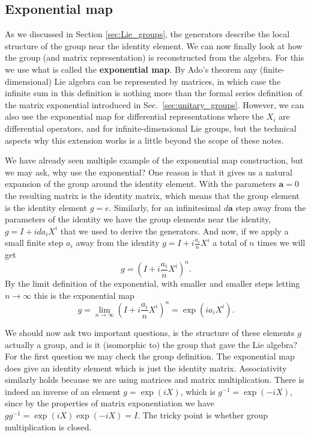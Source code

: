 \documentclass[notes.tex]{subfiles}
\begin{document}
\subsection{Exponential map}
\label{sec:expmap}
As we discussed in Section \ref{sec:Lie_groups}, the generators describe the local structure of the group near the identity element. We can now finally look at how the group (and matrix representation) is reconstructed from the algebra. For this we use what is called the {\bf exponential map}. 
By Ado's theorem any (finite-dimensional) Lie algebra can be represented by matrices, in which case the infinite sum in this definition is nothing more than the formal series definition of the matrix exponential introduced in Sec.~\ref{sec:unitary_groups}. However, we can also use the exponential map for differential representations where the $X_i$ are differential operators, and for infinite-dimensional Lie groups, but the technical aspects why this extension works is a little beyond the scope of these notes.

We have already seen multiple example of the exponential map construction, but we may ask, why use the exponential? One reason is that it gives us a natural expansion of the group around the identity element. With the parameters $\mathbf a=0$ the resulting matrix is the identity matrix, which means that the group element is the identity element $g=e$. Similarly, for an infinitesimal $d\mathbf a$ step away from the parameters of the identity we have the group elements near the identity, $g=I+ida_iX^i$ that we used to derive the generators. And now, if we apply a small finite step  $a_i$ away from the identity $g=I+i\frac{a_i}{n}X^i$ a total of $n$ times we will get
\[g=\left(I+i\frac{a_i}{n}X^i\right)^n. \]
By the limit definition of the exponential, with smaller and smaller steps letting $n\to\infty$ this is the exponential map
\[g=\lim_{n\to\infty}\left(I+i\frac{a_i}{n}X^i\right)^n=\exp( ia_iX^i). \]

We should now ask two important questions, is the structure of these elements $g$ actually a group, and is it (isomorphic to) the group that gave the Lie algebra? For the first question we may check the group definition. The exponential map does give an identity element which is just the identity matrix. Associativity similarly holds because we are using matrices and matrix multiplication. There is indeed an inverse of an element $g=\exp{(iX)}$, which is $g^{-1}=\exp{(-iX)}$, since by the properties of matrix exponentiation we have $gg^{-1}=\exp{(iX)}\exp{(-iX)}=I$. The tricky point is whether group multiplication is closed.
\end{document}
